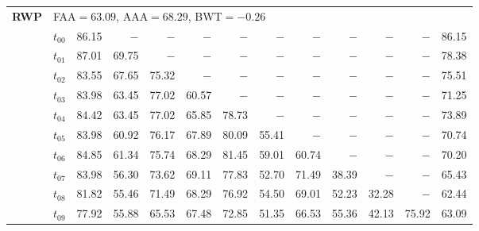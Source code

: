 \begin{table}[ht]
\begin{tabular}{@{}l l r r r r r r r r r r r@{}}
\midrule
\multirow{11}{*}{\textbf{RWP}} & \multicolumn{12}{l}{\quad\small FAA$=63.09$,\; AAA$=68.29$,\; BWT$=-0.26$} \\
 & $t_{00}$ & 86.15 & $-$ & $-$ & $-$ & $-$ & $-$ & $-$ & $-$ & $-$ & $-$ & 86.15 \\
 & $t_{01}$ & 87.01 & 69.75 & $-$ & $-$ & $-$ & $-$ & $-$ & $-$ & $-$ & $-$ & 78.38 \\
 & $t_{02}$ & 83.55 & 67.65 & 75.32 & $-$ & $-$ & $-$ & $-$ & $-$ & $-$ & $-$ & 75.51 \\
 & $t_{03}$ & 83.98 & 63.45 & 77.02 & 60.57 & $-$ & $-$ & $-$ & $-$ & $-$ & $-$ & 71.25 \\
 & $t_{04}$ & 84.42 & 63.45 & 77.02 & 65.85 & 78.73 & $-$ & $-$ & $-$ & $-$ & $-$ & 73.89 \\
 & $t_{05}$ & 83.98 & 60.92 & 76.17 & 67.89 & 80.09 & 55.41 & $-$ & $-$ & $-$ & $-$ & 70.74 \\
 & $t_{06}$ & 84.85 & 61.34 & 75.74 & 68.29 & 81.45 & 59.01 & 60.74 & $-$ & $-$ & $-$ & 70.20 \\
 & $t_{07}$ & 83.98 & 56.30 & 73.62 & 69.11 & 77.83 & 52.70 & 71.49 & 38.39 & $-$ & $-$ & 65.43 \\
 & $t_{08}$ & 81.82 & 55.46 & 71.49 & 68.29 & 76.92 & 54.50 & 69.01 & 52.23 & 32.28 & $-$ & 62.44 \\
 & $t_{09}$ & 77.92 & 55.88 & 65.53 & 67.48 & 72.85 & 51.35 & 66.53 & 55.36 & 42.13 & 75.92 & 63.09 \\
\bottomrule
\end{tabular}
\end{table}

